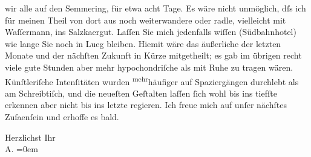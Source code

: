               wir alle auf den Semmering, für etwa {\pb}acht Tage. Es wäre nicht unmöglich, dſs ich für meinen
               Theil von dort aus noch weiterwandere oder radle, vielleicht mit Waſſermann, ins Salzka{\geminationm}ergut. Laſſen Sie mich jedenfalls wiſſen (Südbahnhotel) wie lange Sie noch in Lueg bleiben. Hiemit wäre das äußerliche der
               letzten Monate und der nächſten Zukunft in Kürze mitgetheilt; es gab im übrigen recht
               viele gute Stunden aber mehr hypochondriſche als mit Ruhe zu tragen wären.
               Künſtleriſche Intenſitäten wurden \substVorne{}\textsuperscript{mehr}\substDazwischen{}häufiger\substHinten{} auf Spaziergängen durchlebt als am Schreibtiſch, und die neueſten Geſtalten
               laſſen ſich wohl bis ins tiefſte erkennen aber nicht bis ins letzte regieren. Ich
               freue mich auf unſer nächſtes Zuſa{\geminationm}enſein und erhoffe es
               bald.\pend
           
\pstart
           Herzlichst Ihr{\\[\baselineskip]}\spacefill\mbox{A.}\pend
           \leftskip=0em{}\endnumbering{}  
      